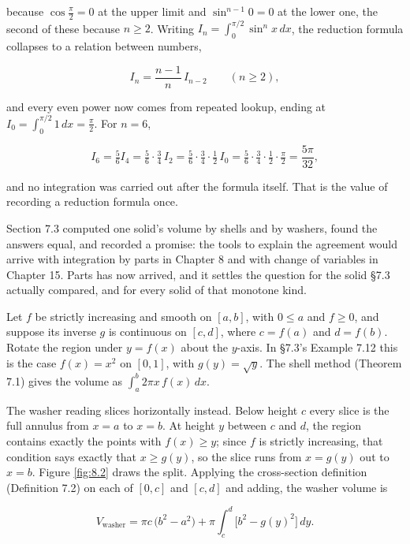 \documentclass[a4paper,12pt,oneside]{memoir}
\begin{document}
because \(\cos\tfrac{\pi}{2} = 0\) at the upper limit and \(\sin^{n-1}0 = 0\) at the lower one, the second of these because \(n \ge 2\). Writing \(I_{n} = \int_{0}^{\pi/2}\sin^{n}x\,dx\), the reduction formula collapses to a relation between numbers,

\[ I_{n} = \frac{n-1}{n}\,I_{n-2} \qquad (n \ge 2), \]

and every even power now comes from repeated lookup, ending at \(I_{0} = \int_{0}^{\pi/2} 1\,dx = \tfrac{\pi}{2}\). For \(n = 6\),

\[ I_{6} = \tfrac{5}{6}I_{4} = \tfrac{5}{6}\cdot\tfrac{3}{4}\,I_{2} = \tfrac{5}{6}\cdot\tfrac{3}{4}\cdot\tfrac{1}{2}\,I_{0} = \tfrac{5}{6}\cdot\tfrac{3}{4}\cdot\tfrac{1}{2}\cdot\tfrac{\pi}{2} = \frac{5\pi}{32}, \]

and no integration was carried out after the formula itself. That is the value of recording a reduction formula once.

Section 7.3 computed one solid’s volume by shells and by washers, found the answers equal, and recorded a promise: the tools to explain the agreement would arrive with integration by parts in Chapter 8 and with change of variables in Chapter 15. Parts has now arrived, and it settles the question for the solid §7.3 actually compared, and for every solid of that monotone kind.

Let \(f\) be strictly increasing and smooth on \([a, b]\), with \(0 \le a\) and \(f \ge 0\), and suppose its inverse \(g\) is continuous on \([c, d]\), where \(c = f(a)\) and \(d = f(b)\). Rotate the region under \(y = f(x)\) about the \(y\)-axis. In §7.3’s Example 7.12 this is the case \(f(x) = x^{2}\) on \([0, 1]\), with \(g(y) = \sqrt{y}\). The shell method (Theorem 7.1) gives the volume as \(\int_a^b 2\pi x\,f(x)\,dx\).

The washer reading slices horizontally instead. Below height \(c\) every slice is the full annulus from \(x = a\) to \(x = b\). At height \(y\) between \(c\) and \(d\), the region contains exactly the points with \(f(x) \ge y\); since \(f\) is strictly increasing, that condition says exactly that \(x \ge g(y)\), so the slice runs from \(x = g(y)\) out to \(x = b\). Figure \ref{fig:8.2} draws the split. Applying the cross-section definition (Definition 7.2) on each of \([0, c]\) and \([c, d]\) and adding, the washer volume is

\[ V_{\text{washer}} = \pi c\,\bigl(b^{2} - a^{2}\bigr) + \pi\int_{c}^{d} \bigl[b^{2} - g(y)^{2}\bigr]\,dy. \]
\end{document}
